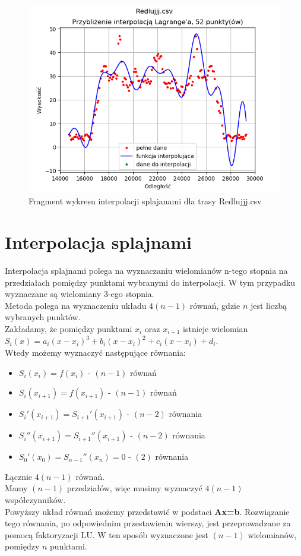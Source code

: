 \documentclass{article} %
\begin{document}
\begin{figure}[h!]
    \begin{minipage}[b]{0.4\textwidth}
        \includegraphics[width=\textwidth]{lagrange/rozne_trasy/red_52_cale.png}
        \caption{Fragment wykresu interpolacji splajanami dla trasy Redlujjj.csv}
    \end{minipage}
\end{figure}

\newpage
\section{Interpolacja splajnami}
Interpolacja splajnami polega na wyznaczaniu wielomianów n-tego stopnia na przedziałach pomiędzy
punktami wybranymi do interpolacji. W tym przypadku wyznaczane są wielomiany 3-ego stopnia.\\
Metoda polega na wyznaczeniu układu $4(n-1)$ równań, gdzie $n$ jest liczbą wybranych punktów.\\
Zakładamy, że pomiędzy punktami $x_{i}$ oraz $x_{i+1}$ istnieje wielomian $S_{i}(x) = a_{i}(x-x_{i})^3+b_{i}(x-x_{i})^2+c_{i}(x-x_{i})+d_{i}$. \\
Wtedy możemy wyznaczyć następujące równania: \\
\begin{itemize}
    \item{$S_{i}(x_{i}) = f(x_{i})$ - $(n-1)$ równań}
    \item{$S_{i}(x_{i+1}) = f(x_{i+1})$ - $(n-1)$ równań}
    \item{$S_{i}'(x_{i+1}) = S_{i+1}'(x_{i+1})$ - $(n-2)$ równania}
    \item{$S_{i}''(x_{i+1}) = S_{i+1}''(x_{i+1})$ - $(n-2)$ równania}
    \item {$S_{0}'(x_{0}) = S_{n-1}''(x_{n}) = 0$ - $(2)$ równania}
\end{itemize} 
Łącznie $4(n-1)$ równań. \\
Mamy $(n-1)$ przedziałów, więc musimy wyznaczyć $4(n-1)$ współczynników. \\
Powyższy układ równań możemy przedstawić w podstaci \textbf{Ax=b}. Rozwiązanie tego równania, 
po odpowiednim przestawieniu wierszy, jest przeprowadzane za pomocą faktoryzacji LU. 
W ten sposób wyznaczone jest $(n-1)$ wielomianów, pomiędzy $n$ punktami. 
\newpage
\end{document}
